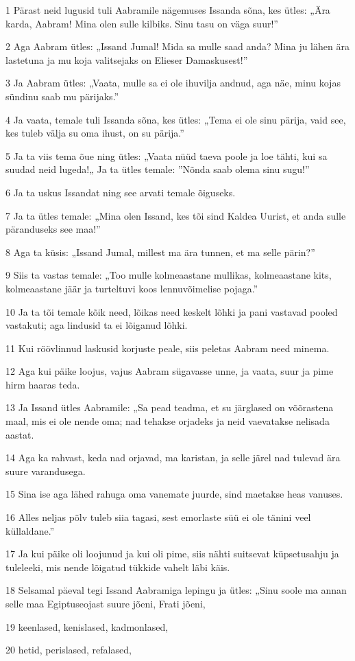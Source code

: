 \par 1 Pärast neid lugusid tuli Aabramile nägemuses Issanda sõna, kes ütles: „Ära karda, Aabram! Mina olen sulle kilbiks. Sinu tasu on väga suur!”
\par 2 Aga Aabram ütles: „Issand Jumal! Mida sa mulle saad anda? Mina ju lähen ära lastetuna ja mu koja valitsejaks on Elieser Damaskusest!”
\par 3 Ja Aabram ütles: „Vaata, mulle sa ei ole ihuvilja andnud, aga näe, minu kojas sündinu saab mu pärijaks.”
\par 4 Ja vaata, temale tuli Issanda sõna, kes ütles: „Tema ei ole sinu pärija, vaid see, kes tuleb välja su oma ihust, on su pärija.”
\par 5 Ja ta viis tema õue ning ütles: „Vaata nüüd taeva poole ja loe tähti, kui sa suudad neid lugeda!„ Ja ta ütles temale: ”Nõnda saab olema sinu sugu!”
\par 6 Ja ta uskus Issandat ning see arvati temale õiguseks.
\par 7 Ja ta ütles temale: „Mina olen Issand, kes tõi sind Kaldea Uurist, et anda sulle päranduseks see maa!”
\par 8 Aga ta küsis: „Issand Jumal, millest ma ära tunnen, et ma selle pärin?”
\par 9 Siis ta vastas temale: „Too mulle kolmeaastane mullikas, kolmeaastane kits, kolmeaastane jäär ja turteltuvi koos lennuvõimelise pojaga.”
\par 10 Ja ta tõi temale kõik need, lõikas need keskelt lõhki ja pani vastavad pooled vastakuti; aga lindusid ta ei lõiganud lõhki.
\par 11 Kui röövlinnud laskusid korjuste peale, siis peletas Aabram need minema.
\par 12 Aga kui päike loojus, vajus Aabram sügavasse unne, ja vaata, suur ja pime hirm haaras teda.
\par 13 Ja Issand ütles Aabramile: „Sa pead teadma, et su järglased on võõrastena maal, mis ei ole nende oma; nad tehakse orjadeks ja neid vaevatakse nelisada aastat.
\par 14 Aga ka rahvast, keda nad orjavad, ma karistan, ja selle järel nad tulevad ära suure varandusega.
\par 15 Sina ise aga lähed rahuga oma vanemate juurde, sind maetakse heas vanuses.
\par 16 Alles neljas põlv tuleb siia tagasi, sest emorlaste süü ei ole tänini veel küllaldane.”
\par 17 Ja kui päike oli loojunud ja kui oli pime, siis nähti suitsevat küpsetusahju ja tuleleeki, mis nende lõigatud tükkide vahelt läbi käis.
\par 18 Selsamal päeval tegi Issand Aabramiga lepingu ja ütles: „Sinu soole ma annan selle maa Egiptuseojast suure jõeni, Frati jõeni,
\par 19 keenlased, kenislased, kadmonlased,
\par 20 hetid, perislased, refalased,

